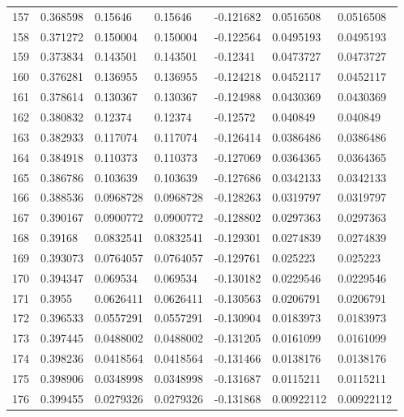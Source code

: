 \begin{longtable}{l|lll|lll}
 157 &  0.368598    & 0.15646     & 0.15646     & -0.121682    & 0.0516508   & 0.0516508   \\
 158 &  0.371272    & 0.150004    & 0.150004    & -0.122564    & 0.0495193   & 0.0495193   \\
 159 &  0.373834    & 0.143501    & 0.143501    & -0.12341     & 0.0473727   & 0.0473727   \\
 160 &  0.376281    & 0.136955    & 0.136955    & -0.124218    & 0.0452117   & 0.0452117   \\
 161 &  0.378614    & 0.130367    & 0.130367    & -0.124988    & 0.0430369   & 0.0430369   \\
 162 &  0.380832    & 0.12374     & 0.12374     & -0.12572     & 0.040849    & 0.040849    \\
 163 &  0.382933    & 0.117074    & 0.117074    & -0.126414    & 0.0386486   & 0.0386486   \\
 164 &  0.384918    & 0.110373    & 0.110373    & -0.127069    & 0.0364365   & 0.0364365   \\
 165 &  0.386786    & 0.103639    & 0.103639    & -0.127686    & 0.0342133   & 0.0342133   \\
 166 &  0.388536    & 0.0968728   & 0.0968728   & -0.128263    & 0.0319797   & 0.0319797   \\
 167 &  0.390167    & 0.0900772   & 0.0900772   & -0.128802    & 0.0297363   & 0.0297363   \\
 168 &  0.39168     & 0.0832541   & 0.0832541   & -0.129301    & 0.0274839   & 0.0274839   \\
 169 &  0.393073    & 0.0764057   & 0.0764057   & -0.129761    & 0.025223    & 0.025223    \\
 170 &  0.394347    & 0.069534    & 0.069534    & -0.130182    & 0.0229546   & 0.0229546   \\
 171 &  0.3955      & 0.0626411   & 0.0626411   & -0.130563    & 0.0206791   & 0.0206791   \\
 172 &  0.396533    & 0.0557291   & 0.0557291   & -0.130904    & 0.0183973   & 0.0183973   \\
 173 &  0.397445    & 0.0488002   & 0.0488002   & -0.131205    & 0.0161099   & 0.0161099   \\
 174 &  0.398236    & 0.0418564   & 0.0418564   & -0.131466    & 0.0138176   & 0.0138176   \\
 175 &  0.398906    & 0.0348998   & 0.0348998   & -0.131687    & 0.0115211   & 0.0115211   \\
 176 &  0.399455    & 0.0279326   & 0.0279326   & -0.131868    & 0.00922112  & 0.00922112  \\

\end{longtable}
